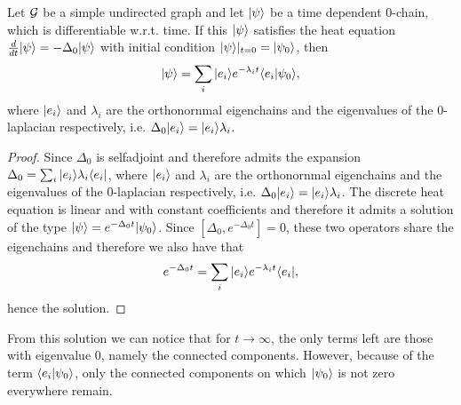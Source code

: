 \documentclass[../2.tex]{subfiles}
\begin{document}
    \begin{prop}
        Let $\mathcal{G}$ be a simple undirected graph and let $| \psi \rangle$ be a time dependent $0$-chain, which is differentiable w.r.t. time.
        If this $| \psi \rangle$ satisfies the heat equation $\frac{d}{dt}| \psi \rangle = -\Delta_0 | \psi \rangle$ with initial condition $| \psi \rangle|_{t = 0} = | \psi_0 \rangle$, then
        \[ | \psi \rangle = \sum_i| e_i \rangle e^{-\lambda_i t}\langle e_i | \psi_0 \rangle, \]
        where $| e_i \rangle$ and $\lambda_i$ are the orthonornmal eigenchains and the eigenvalues of the $0$-laplacian respectively,
        i.e. $\Delta_0| e_i \rangle =| e_i \rangle\lambda_i$.
    \end{prop}
    \begin{proof}
        Since $\Delta_0$ is selfadjoint and therefore admits the expansion $\Delta_0 = \sum_i | e_i \rangle\lambda_i\langle e_i |$,
        where $| e_i \rangle$ and $\lambda_i$ are the orthonornmal eigenchains and the eigenvalues of the $0$-laplacian respectively,
        i.e. $\Delta_0| e_i \rangle =| e_i \rangle\lambda_i$. The discrete heat equation is linear and with constant coefficients and therefore
        it admits a solution of the type $| \psi \rangle = e^{-\Delta_0 t}| \psi_0 \rangle$.
        Since $[\Delta_0, e^{-\Delta_0 t}] = 0$, these two operators share the eigenchains and therefore we also have that
        \[ e^{-\Delta_0 t} = \sum_i | e_i \rangle e^{-\lambda_i t} \langle e_i |,\]
        hence the solution. \qedhere
    \end{proof}

    From this solution we can notice that for $t \to \infty$, the only terms left are those with eigenvalue $0$, namely the connected components.
    However, because of the term $\langle e_i | \psi_0 \rangle$, only the connected components on which $| \psi_0 \rangle$ is not zero everywhere remain.
\end{document}
